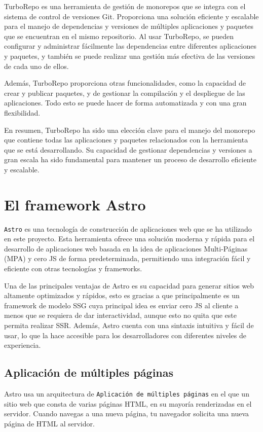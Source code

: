 TurboRepo es una herramienta de gestión de monorepos que se integra con el sistema de control de versiones Git. Proporciona una solución eficiente y escalable para el manejo de dependencias y versiones de múltiples aplicaciones y paquetes que se encuentran en el mismo repositorio. Al usar TurboRepo, se pueden configurar y administrar fácilmente las dependencias entre diferentes aplicaciones y paquetes, y también se puede realizar una gestión más efectiva de las versiones de cada uno de ellos.

Además, TurboRepo proporciona otras funcionalidades, como la capacidad de crear y publicar paquetes, y de gestionar la compilación y el despliegue de las aplicaciones. Todo esto se puede hacer de forma automatizada y con una gran flexibilidad.

En resumen, TurboRepo ha sido una elección clave para el manejo del monorepo que contiene todas las aplicaciones y paquetes relacionados con la herramienta que se está desarrollando. Su capacidad de gestionar dependencias y versiones a gran escala ha sido fundamental para mantener un proceso de desarrollo eficiente y escalable.

\section{El framework Astro}
\verb|Astro| \cite{astro} es una tecnología de construcción de aplicaciones web que se ha utilizado en este proyecto. Esta herramienta ofrece una solución moderna y rápida para el desarrollo de aplicaciones web basada en la idea de aplicaciones Multi-Páginas (MPA) y cero JS de forma predeterminada, permitiendo una integración fácil y eficiente con otras tecnologías y frameworks.

Una de las principales ventajas de Astro es su capacidad para generar sitios web altamente optimizados y rápidos, esto es gracias a que principalmente es un framework de modelo SSG cuya principal idea es enviar cero JS al cliente a menos que se requiera de dar interactividad, aunque esto no quita que este permita realizar SSR. Además, Astro cuenta con una sintaxis intuitiva y fácil de usar, lo que la hace accesible para los desarrolladores con diferentes niveles de experiencia.

\subsection{Aplicación de múltiples páginas}
Astro usa un arquitectura de \verb|Aplicación de múltiples páginas|\cite{multipage} en el que un sitio web que consta de varias páginas HTML, en su mayoría renderizadas en el servidor. Cuando navegas a una nueva página, tu navegador solicita una nueva página de HTML al servidor.

